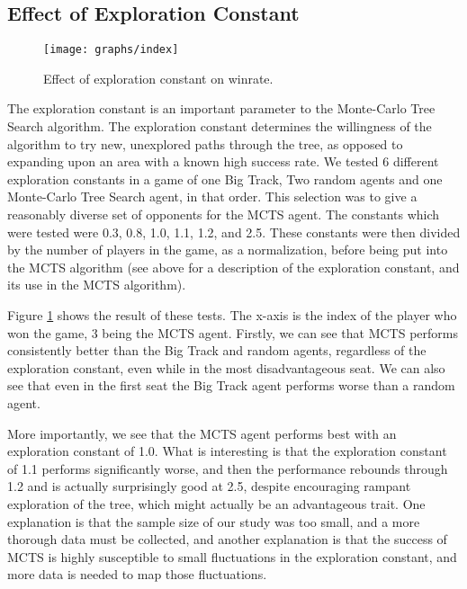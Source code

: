 \documentclass[11pt, letterpaper, twoside]{article}
\begin{document}
\subsection{Effect of Exploration Constant}

\begin{figure}
\begin{center}
  \texttt{[image: graphs/index]}
  \caption{Effect of exploration constant on winrate.}
  \label{fig:explore_const}
 \end{center}
\end{figure}

The exploration constant is an important parameter to the Monte-Carlo Tree Search algorithm. The exploration constant determines the willingness of the algorithm to try new, unexplored paths through the tree, as opposed to expanding upon an area with a known high success rate. We tested 6 different exploration constants in a game of one Big Track, Two random agents and one Monte-Carlo Tree Search agent, in that order. This selection was to give a reasonably diverse set of opponents for the MCTS agent. The constants which were tested were 0.3, 0.8, 1.0, 1.1, 1.2, and 2.5. These constants were then divided by the number of players in the game, as a normalization, before being put into the MCTS algorithm (see above for a description of the exploration constant, and its use in the MCTS algorithm). 

Figure \ref{fig:explore_const} shows the result of these tests. The x-axis is the index of the player who won the game, 3 being the MCTS agent. Firstly, we can see that MCTS performs consistently better than the Big Track and random agents, regardless of the exploration constant, even while in the most disadvantageous seat. We can also see that even in the first seat the Big Track agent performs worse than a random agent. 

More importantly, we see that the MCTS agent performs best with an exploration constant of 1.0. What is interesting is that the exploration constant of 1.1 performs significantly worse, and then the performance rebounds through 1.2 and is actually surprisingly good at 2.5, despite encouraging rampant exploration of the tree, which might actually be an advantageous trait. One explanation is that the sample size of our study was too small, and a more thorough data must be collected, and another explanation is that the success of MCTS is highly susceptible to small fluctuations in the exploration constant, and more data is needed to map those fluctuations. 
\end{document}
